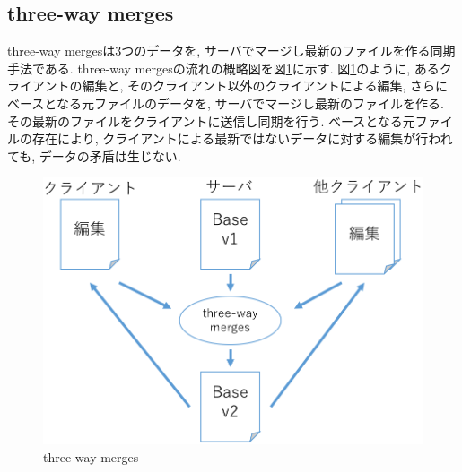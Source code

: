 \subsection{three-way merges}
three-way merges\cite{THREE}は3つのデータを, サーバでマージし最新のファイルを作る同期手法である. three-way mergesの流れの概略図を図\ref{threeway}に示す. 図\ref{threeway}のように, あるクライアントの編集と, そのクライアント以外のクライアントによる編集, さらにベースとなる元ファイルのデータを, サーバでマージし最新のファイルを作る. その最新のファイルをクライアントに送信し同期を行う. ベースとなる元ファイルの存在により, クライアントによる最新ではないデータに対する編集が行われても, データの矛盾は生じない.
\begin{figure}[htbp]
  \begin{center}
    \includegraphics[scale=0.5]{images/threeway}
    \caption{three-way merges}
    \label{threeway}
  \end{center}
\end{figure}
%
